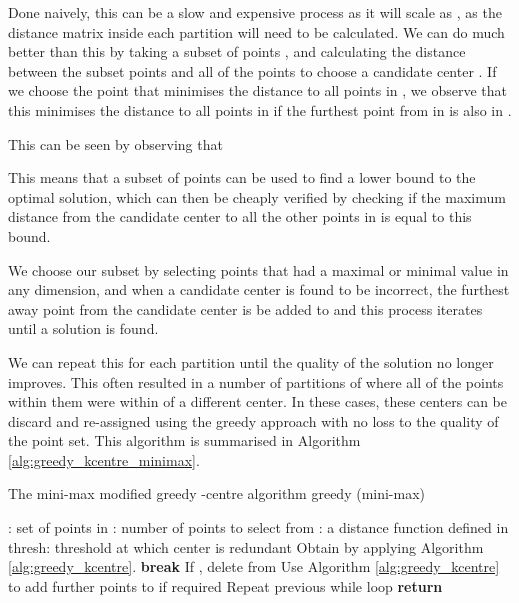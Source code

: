 \documentclass{article}
\begin{document}
Done naively, this can be a slow and expensive process as it will scale as , as the distance matrix inside each partition  will need to be calculated. We can do much better than this by taking a subset of points , and calculating the distance between the subset points  and all of the points  to choose a candidate center . If we choose the point that minimises the distance to all points in , we observe that this minimises the distance to all points in  if the furthest point from  in  is also in .

This can be seen by observing that 



This means that a subset of points  can be used to find a lower bound to the optimal solution, which can then be cheaply verified by checking if the maximum distance from the candidate center  to all the other points in  is equal to this bound. 

We choose our subset  by selecting points that had a maximal or minimal value in any dimension, and when a candidate center is found to be incorrect, the furthest away point from the candidate center is be added to  and this process iterates until a solution is found.

We can repeat this for each partition until the quality  of the solution no longer improves. This often resulted in a number of partitions  of  where all of the points within them were within  of a different center. In these cases, these centers can be discard and re-assigned using the greedy approach with no loss to the quality of the point set. This algorithm is summarised in Algorithm \ref{alg:greedy_kcentre_minimax}.

\begin{algorithm}
\caption{The mini-max modified greedy -centre algorithm \textemdash{} greedy (mini-max)}\label{alg:greedy_kcentre_minimax}
\begin{algorithmic}
\Require : set of points in 
\Require : number of points to select from  
\Require : a distance function defined in 
\Require thresh: threshold at which center is redundant
\State Obtain  by applying Algorithm \ref{alg:greedy_kcentre}.
\While{}
    \State 
        \State 
        \State 
        \State 
    \EndFor
    \If{}
        \State \textbf{break}
    \Else
        \State 
    \EndIf
\EndWhile
{}
    \State 
    \State 
    \State If , delete  from 
\EndFor
\State Use Algorithm \ref{alg:greedy_kcentre} to add further points to  if required
\State Repeat previous while loop
\State \textbf{return} 
\end{algorithmic}
\end{algorithm}
\end{document}
